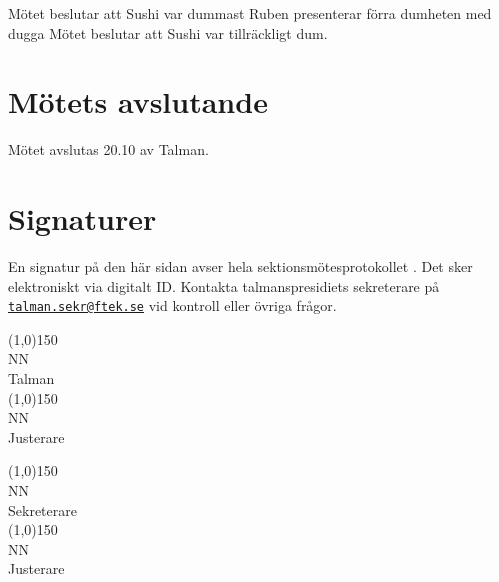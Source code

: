 \documentclass[hidelinks]{sektionsmote}
\begin{document}
Mötet beslutar att Sushi var dummast
Ruben presenterar förra dumheten med dugga
Mötet beslutar att Sushi var tillräckligt dum.


\section{Mötets avslutande}
Mötet avslutas 20.10 av Talman.

\clearpage
\section*{Signaturer}
En signatur på den här sidan avser hela sektionsmötesprotokollet \themote. Det sker elektroniskt via digitalt ID. Kontakta talmanspresidiets sekreterare på \href{mailto:talman.sekr@ftek.se}{\texttt{talman.sekr@ftek.se}} vid kontroll eller övriga frågor. 

\vspace{4cm}

\begin{minipage}{0.45\textwidth}
    \begin{center}
        \line(1,0){150}\\
        \footnotesize NN\\ %
        Talman\\[3cm]
        \line(1,0){150}\\
        \footnotesize NN\\ %
        Justerare
        \end{center}
        \end{minipage}
        \begin{minipage}{0.45\textwidth}
        \begin{center}
        \line(1,0){150}\\
        \footnotesize NN\\ %
        Sekreterare\\[3cm]
        \line(1,0){150}\\
        \footnotesize NN\\ %
        Justerare
    \end{center}
\end{minipage}

\clearpage
%
\end{document}
